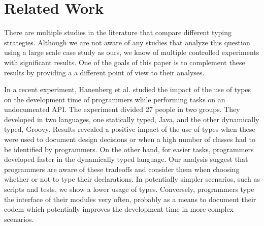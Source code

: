 \documentclass[msc]{ppgccufmg}
\begin{document}
%
%
\chapter{Related Work\label{related}}
There are multiple studies in the literature that compare different typing strategies.
Although we are not aware of any studies that analyze this question using a large scale case study as ours, we know of multiple controlled experiments with significant results.
One of the goals of this paper is to complement these results by providing a a different point of view to their analyses. 

In a recent experiment, Hanenberg et al. \cite{Hanenberg13} studied the impact of the use of types on the development time of programmers while performing tasks on an undocumented API.
The experiment divided 27 people in two groups.
They developed in two languages, one statically typed, Java, and the other dynamically typed, Groovy.
Results revealed a positive impact of the use of types when these were used to document design decisions or when a high number of classes had to be identified by programmers.
On the other hand, for easier tasks, programmers developed faster in the dynamically typed language.
Our analysis suggest that programmers are aware of these tradeoffs and consider them when choosing whether or not to type their declarations.
In potentially simpler scenarios, such as scripts and tests, we show a lower usage of types.
Conversely, programmers type the interface of their modules very often, probably as a means to document their codem which potentially improves the development time in more complex scenarios.
\end{document}
